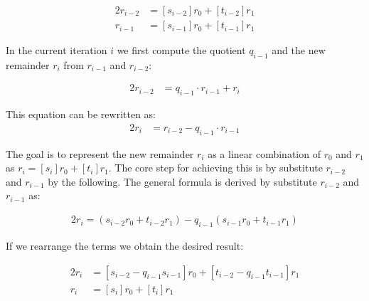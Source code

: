 \noindent
\begin{alignat*}{2}
r_{i - 2} &= [s_{i-2}]r_0 +[t_{i-2}]r_1\\
r_{i-1} &= [s_{i-1}]r_0 +[t_{i-1}]r_1   
\end{alignat*}



\noindent
In the current iteration $i$ we first compute the quotient $q_{i-1}$ and the new remainder $r_i$ from $r_{i-1}$ and $r_{i-2}$:

\noindent
\begin{alignat*}{2}
r_{i-2} &= q_{i-1} \cdot r_{i-1}+r_i 
\end{alignat*}

\noindent
This equation can be rewritten as:\\

\noindent
\begin{alignat*}{2}
r_i &= r_{i-2}-q_{i-1} \cdot r_{i-1} 
\end{alignat*}


\noindent
The goal is to represent the new remainder $r_i$ as a linear combination of $r_0$ and $r_1$ as $r_i = [s_i]r_0 +[t_i]r_1$. The core step for achieving this is by substitute $r_{i-2}$ and $r_{i-1}$ by the following. The general formula is derived by substitute $r_{i-2}$ and $r_{i-1}$ as:


\noindent
\begin{alignat*}{2}
r_i = (s_{i-2}r_0+t_{i-2}r_1)-q_{i-1}(s_{i-1}r_0+t_{i-1}r_1) 
\end{alignat*}


\noindent
If we rearrange the terms we obtain the desired result:

\noindent
\begin{alignat*}{2}
r_i &= [s_{i-2}-q_{i-1}s_{i-1}]r_0 +[t_{i-2}-q_{i-1}t_{i-1}]r_1\\
r_i &= [s_i]r_0 +[t_i]r_1
\end{alignat*}